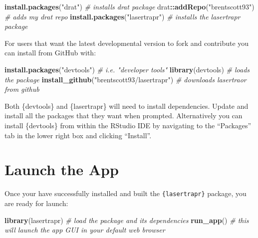 \documentclass[
]{book}
\newenvironment{Shaded}{\begin{snugshade}}{\end{snugshade}}
\newcommand{\CommentTok}[1]{\textcolor[rgb]{0.56,0.35,0.01}{\textit{#1}}}
\newcommand{\FunctionTok}[1]{\textcolor[rgb]{0.13,0.29,0.53}{\textbf{#1}}}
\newcommand{\NormalTok}[1]{#1}
\newcommand{\SpecialCharTok}[1]{\textcolor[rgb]{0.81,0.36,0.00}{\textbf{#1}}}
\newcommand{\StringTok}[1]{\textcolor[rgb]{0.31,0.60,0.02}{#1}}
\begin{document}
\begin{Shaded}
\begin{Highlighting}[]
\FunctionTok{install.packages}\NormalTok{(}\StringTok{"drat"}\NormalTok{) }\CommentTok{\# installs drat package}
\NormalTok{drat}\SpecialCharTok{::}\FunctionTok{addRepo}\NormalTok{(}\StringTok{"brentscott93"}\NormalTok{) }\CommentTok{\# adds my drat repo}
\FunctionTok{install.packages}\NormalTok{(}\StringTok{"lasertrapr"}\NormalTok{) }\CommentTok{\# installs the lasertrapr package}
\end{Highlighting}
\end{Shaded}

For users that want the latest developmental version to fork and contribute you can install from GitHub with:

\begin{Shaded}
\begin{Highlighting}[]
\FunctionTok{install.packages}\NormalTok{(}\StringTok{"devtools"}\NormalTok{) }\CommentTok{\# i.e. "developer tools"}
\FunctionTok{library}\NormalTok{(devtools) }\CommentTok{\# loads the package}
\FunctionTok{install\_github}\NormalTok{(}\StringTok{"brentscott93/lasertrapr"}\NormalTok{) }\CommentTok{\# downloads lasertraor from github}
\end{Highlighting}
\end{Shaded}

Both \{devtools\} and \{lasertrapr\} will need to install dependencies. Update and install all the packages that they want when prompted. Alternatively you can install \{devtools\} from within the RStudio IDE by navigating to the ``Packages'' tab in the lower right box and clicking ``Install''.

\section{Launch the App}\label{launch-the-app}

Once your have successfully installed and built the \texttt{\{lasertrapr\}} package, you are ready for launch:

\begin{Shaded}
\begin{Highlighting}[]
\FunctionTok{library}\NormalTok{(lasertrapr) }\CommentTok{\# load the package and its dependencies}
\FunctionTok{run\_app}\NormalTok{() }\CommentTok{\# this will launch the app GUI in your default web browser}
\end{Highlighting}
\end{Shaded}
\end{document}
